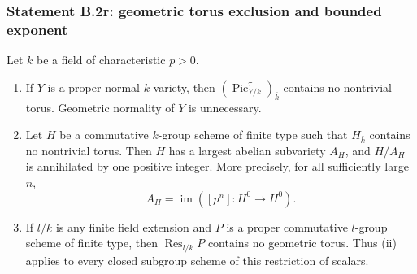 \subsubsection{Statement B.2r: geometric torus exclusion and bounded exponent}
\begin{proposition}\label{B:B2-no-torus-exponent}
Let $k$ be a field of characteristic $p>0$.
\begin{enumerate}
\item If $Y$ is a proper normal $k$-variety, then
$(\operatorname{Pic}^{\tau}_{Y/k})_{\bar k}$ contains no nontrivial
torus.  Geometric normality of $Y$ is unnecessary.
\item Let $H$ be a commutative $k$-group scheme of finite type such that
$H_{\bar k}$ contains no nontrivial torus.  Then $H$ has a largest
abelian subvariety $A_H$, and $H/A_H$ is annihilated by one positive
integer.  More precisely, for all sufficiently large $n$,
\[
 A_H=\operatorname{im}([p^n]:H^0\longrightarrow H^0).
\]
\item If $l/k$ is any finite field extension and $P$ is a
proper commutative $l$-group scheme of finite type, then
$\operatorname{Res}_{l/k}P$ contains no geometric torus.  Thus (ii)
applies to every closed subgroup scheme of this restriction of scalars.
\end{enumerate}
\end{proposition}
